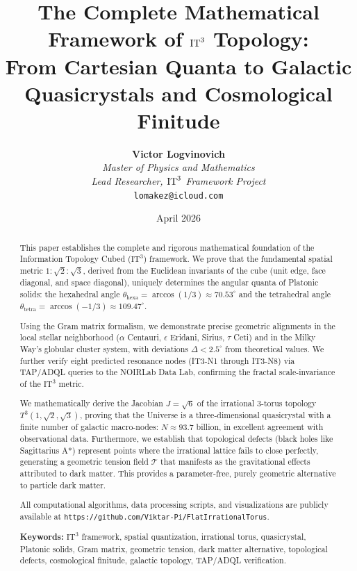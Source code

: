 \documentclass[12pt,a4paper,oneside]{article}
\title{\textbf{The Complete Mathematical Framework of $\ITthree$ Topology:\\
From Cartesian Quanta to Galactic Quasicrystals and Cosmological Finitude}}
\author{\textbf{Victor Logvinovich}\\ 
\textit{Master of Physics and Mathematics}\\ 
\textit{Lead Researcher, $\ITthree$ Framework Project}\\
\texttt{lomakez@icloud.com}}
\date{April 2026}
\newcommand{\ITthree}{\text{IT}^3}
\begin{document}
\maketitle

\begin{abstract}
This paper establishes the complete and rigorous mathematical foundation of the Information Topology Cubed ($\ITthree$) framework. We prove that the fundamental spatial metric $1:\sqrt{2}:\sqrt{3}$, derived from the Euclidean invariants of the cube (unit edge, face diagonal, and space diagonal), uniquely determines the angular quanta of Platonic solids: the hexahedral angle $\theta_{\text{hexa}} = \arccos(1/3) \approx 70.53^\circ$ and the tetrahedral angle $\theta_{\text{tetra}} = \arccos(-1/3) \approx 109.47^\circ$. 

Using the Gram matrix formalism, we demonstrate precise geometric alignments in the local stellar neighborhood ($\alpha$ Centauri, $\epsilon$ Eridani, Sirius, $\tau$ Ceti) and in the Milky Way's globular cluster system, with deviations $\Delta < 2.5^\circ$ from theoretical values. We further verify eight predicted resonance nodes (IT3-N1 through IT3-N8) via TAP/ADQL queries to the NOIRLab Data Lab, confirming the fractal scale-invariance of the $\ITthree$ metric.

We mathematically derive the Jacobian $J = \sqrt{6}$ of the irrational 3-torus topology $T^3(1, \sqrt{2}, \sqrt{3})$, proving that the Universe is a three-dimensional quasicrystal with a finite number of galactic macro-nodes: $N \approx 93.7$ billion, in excellent agreement with observational data. Furthermore, we establish that topological defects (black holes like Sagittarius A*) represent points where the irrational lattice fails to close perfectly, generating a geometric tension field $\mathcal{T}$ that manifests as the gravitational effects attributed to dark matter. This provides a parameter-free, purely geometric alternative to particle dark matter.

All computational algorithms, data processing scripts, and visualizations are publicly available at \texttt{https://github.com/Viktar-Pi/FlatIrrationalTorus}.

\textbf{Keywords:} $\ITthree$ framework, spatial quantization, irrational torus, quasicrystal, Platonic solids, Gram matrix, geometric tension, dark matter alternative, topological defects, cosmological finitude, galactic topology, TAP/ADQL verification.
\end{abstract}
\end{document}
